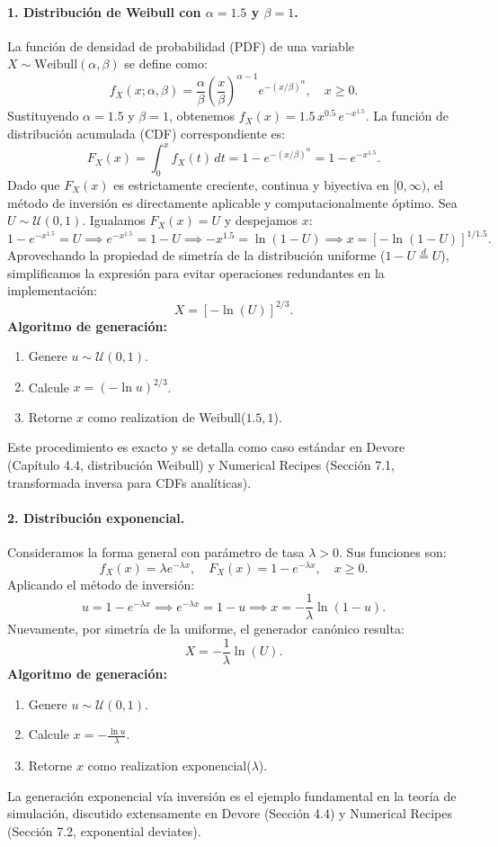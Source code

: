 \documentclass[12pt]{article}
\begin{document}
\paragraph{1. Distribución de Weibull con $\alpha = 1.5$ y $\beta = 1$.}
La función de densidad de probabilidad (PDF) de una variable $X \sim \text{Weibull}(\alpha, \beta)$ se define como:
$$
f_X(x; \alpha, \beta) = \frac{\alpha}{\beta} \left( \frac{x}{\beta} \right)^{\alpha-1} e^{-(x/\beta)^\alpha}, \quad x \geq 0.
$$
Sustituyendo $\alpha = 1.5$ y $\beta = 1$, obtenemos $f_X(x) = 1.5 \, x^{0.5} \, e^{-x^{1.5}}$. La función de distribución acumulada (CDF) correspondiente es:
$$
F_X(x) = \int_0^x f_X(t) \, dt = 1 - e^{-(x/\beta)^\alpha} = 1 - e^{-x^{1.5}}.
$$
Dado que $F_X(x)$ es estrictamente creciente, continua y biyectiva en $[0, \infty)$, el método de inversión es directamente aplicable y computacionalmente óptimo. Sea $U \sim \mathcal{U}(0,1)$. Igualamos $F_X(x) = U$ y despejamos $x$:
$$
1 - e^{-x^{1.5}} = U \implies e^{-x^{1.5}} = 1 - U \implies -x^{1.5} = \ln(1-U) \implies x = \left[ -\ln(1-U) \right]^{1/1.5}.
$$
Aprovechando la propiedad de simetría de la distribución uniforme ($1-U \stackrel{d}{=} U$), simplificamos la expresión para evitar operaciones redundantes en la implementación:
$$
X = \left[ -\ln(U) \right]^{2/3}.
$$
\textbf{Algoritmo de generación:}
\begin{enumerate}
    \item Genere $u \sim \mathcal{U}(0,1)$.
    \item Calcule $x = (-\ln u)^{2/3}$.
    \item Retorne $x$ como realization de Weibull($1.5, 1$).
\end{enumerate}
Este procedimiento es exacto y se detalla como caso estándar en Devore (Capítulo 4.4, distribución Weibull) y Numerical Recipes (Sección 7.1, transformada inversa para CDFs analíticas).

\paragraph{2. Distribución exponencial.}
Consideramos la forma general con parámetro de tasa $\lambda > 0$. Sus funciones son:
$$
f_X(x) = \lambda e^{-\lambda x}, \quad F_X(x) = 1 - e^{-\lambda x}, \quad x \geq 0.
$$
Aplicando el método de inversión:
$$
u = 1 - e^{-\lambda x} \implies e^{-\lambda x} = 1-u \implies x = -\frac{1}{\lambda} \ln(1-u).
$$
Nuevamente, por simetría de la uniforme, el generador canónico resulta:
$$
X = -\frac{1}{\lambda} \ln(U).
$$
\textbf{Algoritmo de generación:}
\begin{enumerate}
    \item Genere $u \sim \mathcal{U}(0,1)$.
    \item Calcule $x = -\frac{\ln u}{\lambda}$.
    \item Retorne $x$ como realization exponencial($\lambda$).
\end{enumerate}
La generación exponencial vía inversión es el ejemplo fundamental en la teoría de simulación, discutido extensamente en Devore (Sección 4.4) y Numerical Recipes (Sección 7.2, exponential deviates).
\end{document}

